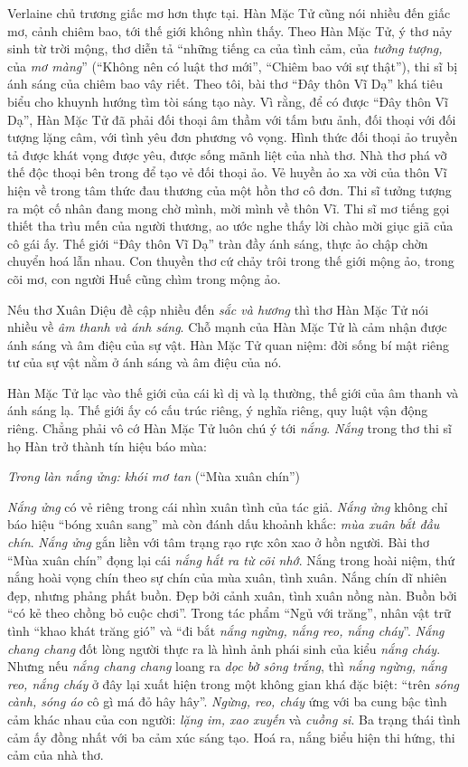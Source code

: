 \documentclass[../main.tex]{subfiles}
\begin{document}
\begin{multicols}{2}
Verlaine chủ trương giấc mơ hơn thực tại. Hàn Mặc Tử cũng nói nhiều đến giấc mơ, cảnh chiêm bao, tới thế giới không nhìn thấy. Theo Hàn Mặc Tử, ý thơ nảy sinh từ trời mộng, thơ diễn tả “những tiếng ca của tình cảm, của \textit{tưởng tượng, }của\textit{ mơ màng}” (“Không nên có luật thơ mới”, “Chiêm bao với sự thật”), thi sĩ bị ánh sáng của chiêm bao vây riết. Theo tôi, bài thơ “Đây thôn Vĩ Dạ” khá tiêu biểu cho khuynh hướng tìm tòi sáng tạo này. Vì rằng, để có được “Đây thôn Vĩ Dạ”, Hàn Mặc Tử đã phải đối thoại âm thầm với tấm bưu ảnh, đối thoại với đối tượng lặng câm, với tình yêu đơn phương vô vọng. Hình thức đối thoại ảo truyền tả được khát vọng được yêu, được sống mãnh liệt của nhà thơ. Nhà thơ phá vỡ thế độc thoại bên trong để tạo vẻ đối thoại ảo. Vẻ huyền ảo xa vời của thôn Vĩ hiện về trong tâm thức đau thương của một hồn thơ cô đơn. Thi sĩ tưởng tượng ra một cố nhân đang mong chờ mình, mời mình về thôn Vĩ. Thi sĩ mơ tiếng gọi thiết tha trìu mến của người thương, ao ước nghe thấy lời chào mời giục giã của cô gái ấy. Thế giới “Đây thôn Vĩ Dạ” tràn đầy ánh sáng, thực ảo chập chờn chuyển hoá lẫn nhau. Con thuyền thơ cứ chảy trôi trong thế giới mộng ảo, trong cõi mơ, con người Huế cũng chìm trong mộng ảo.  
 
Nếu thơ Xuân Diệu đề cập nhiều đến \textit{sắc và hương} thì thơ Hàn Mặc Tử nói nhiều về \textit{âm thanh và ánh sáng}. Chỗ mạnh của Hàn Mặc Tử là cảm nhận được ánh sáng và âm điệu của sự vật. Hàn Mặc Tử  quan niệm: đời sống bí mật riêng tư của sự vật nằm ở ánh sáng và âm điệu của nó. 
 
Hàn Mặc Tử lạc vào thế giới của cái kì dị và lạ thường, thế giới của âm thanh và ánh sáng lạ. Thế giới ấy có cấu trúc riêng, ý nghĩa riêng, quy luật vận động riêng. Chẳng phải vô cớ Hàn Mặc Tử luôn chú ý tới \textit{nắng}. \textit{Nắng} trong thơ thi sĩ họ Hàn trở thành tín hiệu báo mùa: 
 
\textit{Trong làn nắng ửng: khói mơ tan} 
(“Mùa xuân chín”) 
 
\textit{Nắng ửng} có vẻ riêng trong cái nhìn xuân tình của tác giả. \textit{Nắng ửng} không chỉ báo hiệu “bóng xuân sang” mà còn đánh dấu khoảnh khắc: \textit{mùa xuân bắt đầu chín}. \textit{Nắng ửng} gắn liền với tâm trạng rạo rực  xôn xao ở hồn người. Bài thơ “Mùa xuân chín” đọng lại cái \textit{nắng hắt ra từ cõi nhớ}. Nắng trong hoài niệm, thứ nắng hoài vọng chín theo sự chín của mùa xuân, tình xuân. Nắng chín dĩ nhiên đẹp, nhưng phảng phất buồn. Đẹp bởi cảnh xuân, tình xuân nồng nàn. Buồn bởi “có kẻ theo chồng bỏ cuộc chơi”. Trong tác phẩm “Ngủ với trăng”, nhân vật trữ tình “khao khát trăng gió” và “đi bắt \textit{nắng ngừng, nắng reo, nắng cháy}”. \textit{Nắng chang chang} đốt lòng người thực ra là hình ảnh phái sinh của kiểu \textit{nắng cháy}. Nhưng nếu \textit{nắng chang chang} loang ra \textit{dọc bờ sông trắng}, thì \textit{nắng ngừng, nắng reo, nắng cháy} ở đây lại xuất hiện trong một không gian khá đặc biệt: “trên\textit{ sóng cành, sóng áo} cô gì má đỏ hây hây”. \textit{Ngừng, reo, cháy} ứng với ba cung bậc tình cảm khác nhau của con người: \textit{lặng im, xao xuyến} và \textit{cuồng si}. Ba trạng thái tình cảm ấy đồng nhất với ba cảm xúc sáng tạo. Hoá ra, nắng biểu hiện thi hứng, thi cảm của nhà thơ. 
 

\end{multicols}
\end{document}
